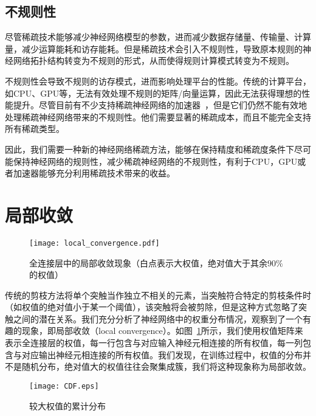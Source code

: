 \subsection{不规则性}
尽管稀疏技术能够减少神经网络模型的参数，进而减少数据存储量、传输量、计算量，减少运算能耗和访存能耗。但是稀疏技术会引入不规则性，导致原本规则的神经网络拓扑结构转变为不规则的形式，从而使得规则计算模式转变为不规则。

不规则性会导致不规则的访存模式，进而影响处理平台的性能。传统的计算平台，如CPU、GPU等，无法有效处理不规则的矩阵/向量运算，因此无法获得理想的性能提升。尽管目前有不少支持稀疏神经网络的加速器~\cite{zhang2016cambricon, albericio2016cnvlutin, han2016eie, han2017ese, angshuman2017scnn}，但是它们仍然不能有效地处理稀疏神经网络带来的不规则性。他们需要显著的稀疏成本，而且不能完全支持所有稀疏类型。

因此，我们需要一种新的神经网络稀疏方法，能够在保持精度和稀疏度条件下尽可能保持神经网络的规则性，减少稀疏神经网络的不规则性，有利于CPU，GPU或者加速器能够充分利用稀疏技术带来的收益。


\section{局部收敛}

\begin{figure}[h]
  \centering
  \texttt{[image: local\_convergence.pdf]}
  \caption{全连接层中的局部收敛现象（白点表示大权值，绝对值大于其余$90\%$的权值）}
  \label{fig:local_convergence}
\end{figure}

传统的剪枝方法将单个突触当作独立不相关的元素，当突触符合特定的剪枝条件时（如权值的绝对值小于某一个阈值），该突触将会被剪除，但是这种方式忽略了突触之间的潜在关系。我们充分分析了神经网络中的权重分布情况，观察到了一个有趣的现象，即局部收敛（local convergence）。如图~\ref{fig:local_convergence}所示，我们使用权值矩阵来表示全连接层的权值，每一行包含与对应输入神经元相连接的所有权值，每一列包含与对应输出神经元相连接的所有权值。我们发现，在训练过程中，权值的分布并不是随机分布，绝对值大的权值往往会聚集成簇，我们将这种现象称为局部收敛。

\begin{figure}[h]
\centering
\texttt{[image: CDF.eps]}
\caption{较大权值的累计分布}
\label{fig:cdf}
\end{figure}

